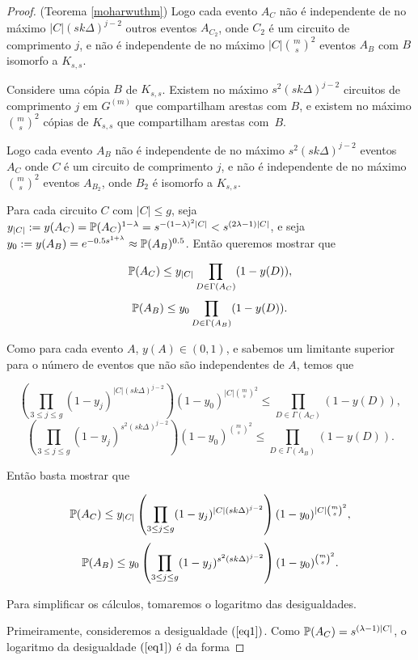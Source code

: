 \begin{proof}{(Teorema \ref{moharwuthm})}
Logo cada evento $A_C$ não é independente de no máximo $|C|(sk\Delta)^{j-2}$ outros eventos $A_{C_2}$, onde $C_2$ é um circuito de comprimento $j$, e não é independente de no máximo $|C|\binom{m}{s}^2$ eventos $A_B$ com $B$ isomorfo a $K_{s,s}$.

Considere uma cópia $B$ de $K_{s,s}$. Existem no máximo $s^2(sk\Delta)^{j-2}$ circuitos de comprimento $j$ em $G^{(m)}$ que compartilham arestas com $B$, e existem no máximo $\binom{m}{s}^2$ cópias de $K_{s,s}$ que compartilham arestas com~$B$.

Logo cada evento $A_B$ não é independente de no máximo $s^2(sk\Delta)^{j-2}$ eventos $A_C$ onde $C$ é um circuito de comprimento $j$, e não é independente de no máximo $\binom{m}{s}^2$ eventos $A_{B_2}$, onde $B_2$ é isomorfo a $K_{s,s}$.

Para cada circuito $C$ com $|C| \leq g$, seja $y_{|C|} := y(A_C) = \mathbb{P}(A_C)^{1-\lambda} = s^{-(1-\lambda)^2|C|} < s^{(2\lambda - 1)|C|}$, e seja~$y_0 := y(A_B) = e^{-0.5s^{1+\lambda}} \approx \mathbb{P}(A_B)^{0.5}$. Então queremos mostrar que

\[\mathbb{P}(A_C) \leq y_{|C|}\prod_{D\in\Gamma(A_C)}(1-y(D)),\]
\[\mathbb{P}(A_B) \leq y_0\prod_{D\in\Gamma(A_B)}(1-y(D)).\]

Como para cada evento $A$, $y(A) \in (0,1)$, e sabemos um limitante superior para o número de eventos que não são independentes de $A$, temos que

\[\left(\prod_{3\leq j\leq g}(1-y_j)^{|C|(sk\Delta)^{j-2}}\right)(1-y_0)^{|C|\binom{m}{s}^2} \leq \prod_{D\in\Gamma(A_C)}(1-y(D)),\]
\[\left(\prod_{3\leq j\leq g}(1-y_j)^{s^2(sk\Delta)^{j-2}}\right)(1-y_0)^{\binom{m}{s}^2} \leq \prod_{D\in\Gamma(A_B)}(1-y(D)).\]

Então basta mostrar que

\begin{equation}\label{eq1}
\mathbb{P}(A_C) \leq y_{|C|}\left(\prod_{3\leq j\leq g}(1-y_j)^{|C|(sk\Delta)^{j-2}}\right)(1-y_0)^{|C|\binom{m}{s}^2},
\end{equation}
\begin{equation}\label{eq2}
\mathbb{P}(A_B)\leq y_0 \left(\prod_{3\leq j\leq g}(1-y_j)^{s^2(sk\Delta)^{j-2}}\right)(1-y_0)^{\binom{m}{s}^2}.
\end{equation}

Para simplificar os cálculos, tomaremos o logaritmo das desigualdades.

Primeiramente, consideremos a desigualdade $(\ref{eq1})$. Como $\mathbb{P}(A_C) = s^{(\lambda-1)|C|}$, o logaritmo da desigualdade $(\ref{eq1})$ é da forma


\end{proof}
